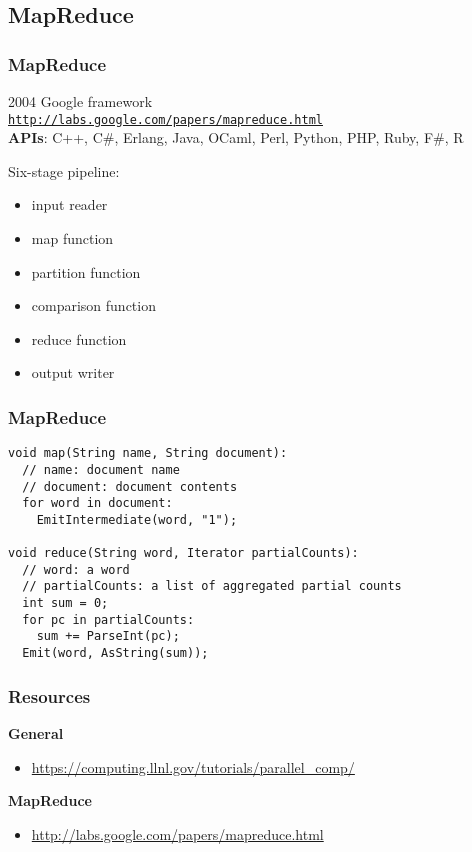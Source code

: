 \documentclass{beamer}
\begin{document}
\subsection{MapReduce}
\begin{frame}
\frametitle{MapReduce}
2004 Google framework\\
\texttt{\url{http://labs.google.com/papers/mapreduce.html}}\\
\textbf{APIs}: C++, C\#, Erlang, Java, OCaml, Perl, Python, PHP, Ruby, F\#, R

Six-stage pipeline:
\begin{itemize}
  \item input reader
  \item map function
  \item partition function
  \item comparison function
  \item reduce function
  \item output writer
\end{itemize}
\end{frame}

\begin{frame}[fragile]
\frametitle{MapReduce}
\begin{verbatim}
void map(String name, String document):
  // name: document name
  // document: document contents
  for word in document:
    EmitIntermediate(word, "1");
 
void reduce(String word, Iterator partialCounts):
  // word: a word
  // partialCounts: a list of aggregated partial counts
  int sum = 0;
  for pc in partialCounts:
    sum += ParseInt(pc);
  Emit(word, AsString(sum));
\end{verbatim}
\end{frame}

\begin{frame}
\frametitle{Resources}
\textbf{General}
\begin{itemize}
  \item \url{https://computing.llnl.gov/tutorials/parallel_comp/}
\end{itemize}

\textbf{MapReduce}
\begin{itemize}
  \item \url{http://labs.google.com/papers/mapreduce.html}
\end{itemize}
\end{frame}

\frame{\tableofcontents}

\frame{\titlepage}
\end{document}
